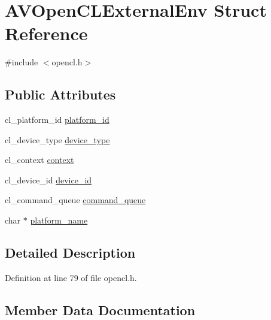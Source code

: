 \hypertarget{struct_a_v_open_c_l_external_env}{}\section{A\+V\+Open\+C\+L\+External\+Env Struct Reference}
\label{struct_a_v_open_c_l_external_env}


{\ttfamily \#include $<$opencl.\+h$>$}

\subsection*{Public Attributes}
\begin{DoxyCompactItemize}
\item 
cl\+\_\+platform\+\_\+id \hyperlink{struct_a_v_open_c_l_external_env_a6a1ac4ebac445a206454a48fc47cf58c}{platform\+\_\+id}
\item 
cl\+\_\+device\+\_\+type \hyperlink{struct_a_v_open_c_l_external_env_a25022bf4d407099e62769ed967082a05}{device\+\_\+type}
\item 
cl\+\_\+context \hyperlink{struct_a_v_open_c_l_external_env_aa527fab85ce8f350fc0cf56ba172d760}{context}
\item 
cl\+\_\+device\+\_\+id \hyperlink{struct_a_v_open_c_l_external_env_a662dfc049e9e00cded39a89d0b17b572}{device\+\_\+id}
\item 
cl\+\_\+command\+\_\+queue \hyperlink{struct_a_v_open_c_l_external_env_afa903036b4d30d8dd4cb13f4bfe7810c}{command\+\_\+queue}
\item 
char $\ast$ \hyperlink{struct_a_v_open_c_l_external_env_a9b9eb739554b516ca3a6e924f8415a73}{platform\+\_\+name}
\end{DoxyCompactItemize}


\subsection{Detailed Description}


Definition at line 79 of file opencl.\+h.



\subsection{Member Data Documentation}
